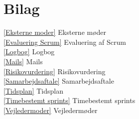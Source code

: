 \chapter{Bilag}\label{kapBilag}

\ref{Eksterne moder} Eksterne møder \\
\ref{Evaluering Scrum} Evaluering af Scrum\\
\ref{Logbog} Logbog\\
\ref{Mails} Mails \\
\ref{Risikovurdering} Risikovurdering \\
\ref{Samarbejdsaftale} Samarbejdsaftale \\
\ref{Tidsplan} Tidsplan \\
\ref{Timebestemt sprints} Timebestemt sprints \\
\ref{Vejledermoder} Vejledermøder

